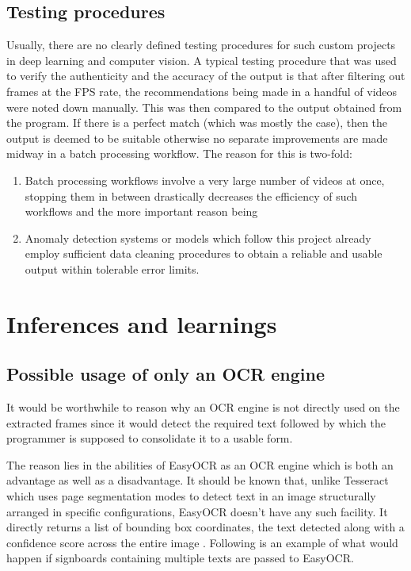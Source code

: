 \subsection{Testing procedures}

Usually, there are no clearly defined testing procedures for such custom projects in deep learning and computer vision. A typical testing procedure that was used to verify the authenticity and the accuracy of the output is that after filtering out frames at the FPS rate, the recommendations being made in a handful of videos were noted down manually. This was then compared to the output obtained from the program. If there is a perfect match (which was mostly the case), then the output is deemed to be suitable otherwise no separate improvements are made midway in a batch processing workflow. The reason for this is two-fold:

\begin{enumerate}

 \item Batch processing workflows involve a very large number of videos at once, stopping them in between drastically decreases the efficiency of such workflows and the more important reason being

 \item Anomaly detection systems or models which follow this project already employ sufficient data cleaning procedures to obtain a reliable and usable output within tolerable error limits.

\end{enumerate}

\section{Inferences and learnings}

\subsection{Possible usage of only an OCR engine}

It would be worthwhile to reason why an OCR engine is not directly used on the extracted frames since it would detect the required text followed by which the programmer is supposed to consolidate it to a usable form. \par

The reason lies in the abilities of EasyOCR as an OCR engine which is both an advantage as well as a disadvantage. It should be known that, unlike Tesseract which uses page segmentation modes \cite{Rosebroc2021} to detect text in an image structurally arranged in specific configurations, EasyOCR doesn’t have any such facility. It directly returns a list of bounding box coordinates, the text detected along with a confidence score across the entire image \cite{Jaided}. Following is an example of what would happen if signboards containing multiple texts are passed to EasyOCR.

